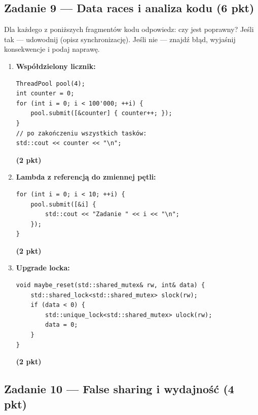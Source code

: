 \documentclass[11pt,a4paper]{article}
\newcommand{\pkt}[1]{\hfill\textbf{(#1 pkt)}}
\begin{document}
\subsection*{Zadanie 9 --- Data races i analiza kodu \pkt{6}}

Dla każdego z poniższych fragmentów kodu odpowiedz: czy jest poprawny? Jeśli tak --- udowodnij (opisz synchronizację). Jeśli nie --- znajdź błąd, wyjaśnij konsekwencje i podaj naprawę.

\begin{enumerate}[label=(\alph*)]
\item \textbf{Współdzielony licznik:}
\begin{lstlisting}
ThreadPool pool(4);
int counter = 0;
for (int i = 0; i < 100'000; ++i) {
    pool.submit([&counter] { counter++; });
}
// po zakończeniu wszystkich tasków:
std::cout << counter << "\n";
\end{lstlisting}
\pkt{2}

\item \textbf{Lambda z referencją do zmiennej pętli:}
\begin{lstlisting}
for (int i = 0; i < 10; ++i) {
    pool.submit([&i] {
        std::cout << "Zadanie " << i << "\n";
    });
}
\end{lstlisting}
\pkt{2}

\item \textbf{Upgrade locka:}
\begin{lstlisting}
void maybe_reset(std::shared_mutex& rw, int& data) {
    std::shared_lock<std::shared_mutex> slock(rw);
    if (data < 0) {
        std::unique_lock<std::shared_mutex> ulock(rw);
        data = 0;
    }
}
\end{lstlisting}
\pkt{2}
\end{enumerate}

\subsection*{Zadanie 10 --- False sharing i wydajność \pkt{4}}
\end{document}
